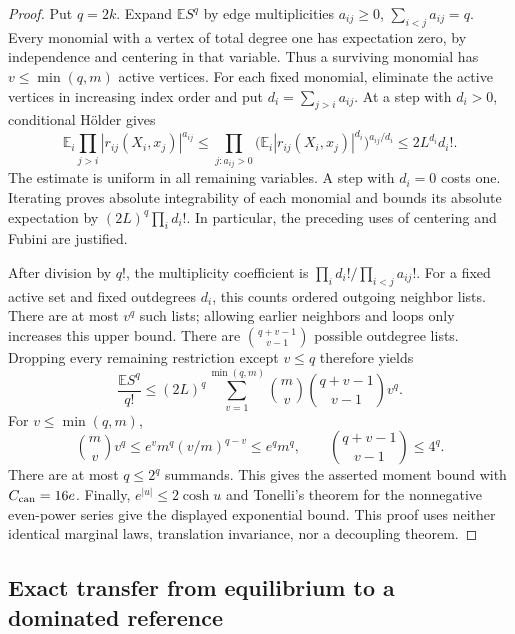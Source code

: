 \documentclass[11pt,reqno]{amsart}
\numberwithin{equation}{section}
\theoremstyle{plain}
\theoremstyle{definition}
\newcommand{\E}{\mathbb E}
\begin{document}
\begin{proof}
Put $q=2k$.  Expand $\E S^q$ by edge multiplicities
$a_{ij}\geq0$, $\sum_{i<j}a_{ij}=q$.  Every monomial with a vertex of
total degree one has expectation zero, by independence and centering in
that variable.  Thus a surviving monomial has $v\leq\min(q,m)$ active
vertices.  For each fixed monomial, eliminate the active vertices in
increasing index order and put $d_i=\sum_{j>i}a_{ij}$.  At a step with
$d_i>0$, conditional H\"older gives
\begin{equation}
 \E_i\prod_{j>i}|r_{ij}(X_i,x_j)|^{a_{ij}}
 \leq\prod_{j:a_{ij}>0}
       \bigl(\E_i|r_{ij}(X_i,x_j)|^{d_i}\bigr)^{a_{ij}/d_i}
 \leq 2L^{d_i}d_i!.
\end{equation}
The estimate is uniform in all remaining variables.  A step with $d_i=0$
costs one.  Iterating proves absolute integrability of each monomial and
bounds its absolute expectation by $(2L)^q\prod_i d_i!$.
In particular, the preceding uses of centering and Fubini are justified.

After division by $q!$, the multiplicity coefficient is
$\prod_i d_i!/\prod_{i<j}a_{ij}!$.  For a fixed active set and fixed
outdegrees $d_i$, this counts ordered outgoing neighbor lists.  There
are at most $v^q$ such lists; allowing earlier neighbors and loops only
increases this upper bound.  There are
$\binom{q+v-1}{v-1}$ possible outdegree lists.  Dropping every remaining
restriction except $v\leq q$ therefore yields
\begin{equation}
 \frac{\E S^q}{q!}
 \leq (2L)^q\sum_{v=1}^{\min(q,m)}
       \binom mv\binom{q+v-1}{v-1}v^q.
\end{equation}
For $v\leq\min(q,m)$,
\begin{equation}
 \binom mv v^q
 \leq e^v m^q(v/m)^{q-v}\leq e^q m^q,
 \qquad
 \binom{q+v-1}{v-1}\leq4^q.
\end{equation}
There are at most $q\leq2^q$ summands.  This gives the asserted moment
bound with $C_{\rm can}=16e$.  Finally, $e^{|u|}\leq2\cosh u$ and Tonelli's
theorem for the nonnegative even-power series give the displayed
exponential bound.  This proof uses neither identical marginal laws,
translation invariance, nor a decoupling theorem.
\end{proof}

\subsection{Exact transfer from equilibrium to a dominated reference}
\end{document}
